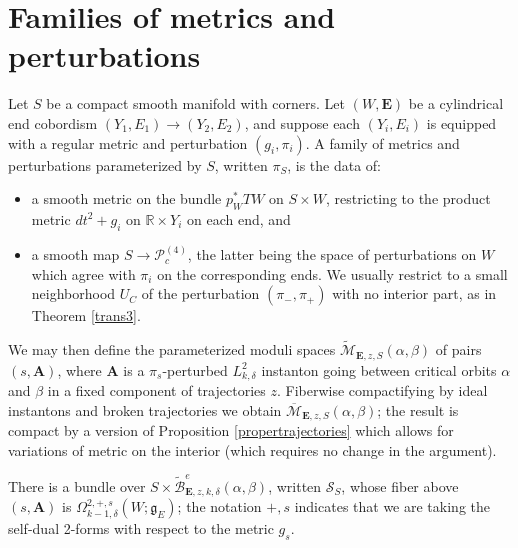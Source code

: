 \documentclass[10pt,a4paper]{amsart}
\theoremstyle{definition}
\theoremstyle{remark}
\numberwithin{figure}{qchap}
\begin{document}
\section{Families of metrics and perturbations}\label{famsec}\label{sec:4d-families}
Let $S$ be a compact smooth manifold with corners. Let $(W,\mathbf{E})$ be a cylindrical end cobordism $(Y_1, E_1) \to (Y_2, E_2)$, and suppose each $(Y_i, E_i)$ is equipped with a regular metric and perturbation $(g_i,\pi_i)$. A family of metrics and perturbations parameterized by $S$, written $\pi_S$, is the data of:
\begin{itemize}
\item a smooth metric on the bundle $p_W^*TW$ on $S \times W$, restricting to the product metric $dt^2 + g_i$ on $\mathbb R \times Y_i$ on each end, and
\item a smooth map $S \to \mathcal P^{(4)}_c$, the latter being the space of perturbations on $W$ which agree with $\pi_i$ on the corresponding ends. We usually restrict to a small neighborhood $U_C$ of the perturbation $(\pi_-,\pi_+)$ with no interior part, as in Theorem \ref{trans3}.
\end{itemize}

We may then define the parameterized moduli spaces $\widetilde{\mathcal M}_{\mathbf{E},z,S}(\alpha, \beta)$ of pairs $(s,\mathbf{A})$, where $\mathbf{A}$ is a $\pi_s$-perturbed $L^2_{k,\delta}$ instanton going between critical orbits $\alpha$ and $\beta$ in a fixed component of trajectories $z$. Fiberwise compactifying by ideal instantons and broken trajectories we obtain $\overline{\mathcal M}_{\mathbf{E},z,S}(\alpha, \beta)$; the result is compact by a version of Proposition \ref{propertrajectories} which allows for variations of metric on the interior (which requires no change in the argument).

There is a bundle over $S \times \widetilde{\mathcal B}^e_{\mathbf{E}, z,k,\delta}(\alpha, \beta)$, written $\mathcal S_S$, whose fiber above $(s, \mathbf{A})$ is $\Omega^{2,+,s}_{k-1,\delta}(W;\mathfrak g_E)$; the notation $+,s$ indicates that we are taking the self-dual 2-forms with respect to the metric $g_s$.
\end{document}
